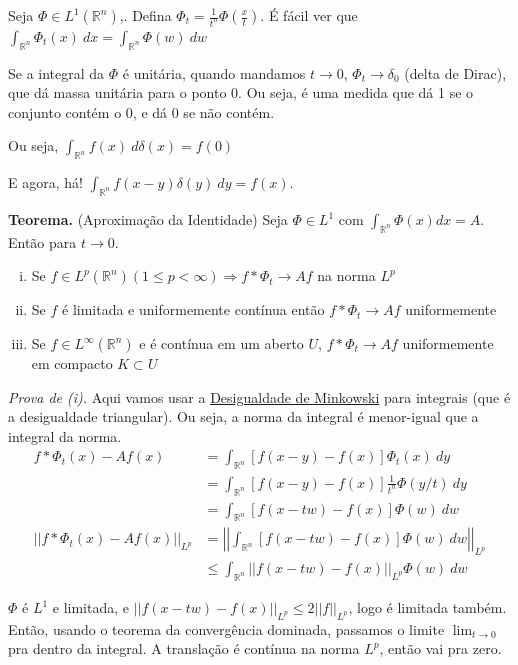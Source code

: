 \documentclass[11pt]{article}
\newcommand{\Rn}{{\mathbb{R}^n}}
\newcommand{\norm}[2]{\left|\left|#1\right|\right|_{L^{#2}}}
\begin{document}
Seja \(\Phi \in L^1(\Rn)\),. Defina \( \Phi_t = \frac{1}{t^n} \Phi(\frac{x}{t}) \). É fácil ver que \(\int_{\mathbb{R}^n} \Phi_t(x)\ dx = \int_{\mathbb{R}^n} \Phi(w)\ dw \)

Se a integral da \(\Phi\) é unitária, quando mandamos \(t \rightarrow 0 \), \(\Phi_t \rightarrow \delta_0\) (delta de Dirac), que dá massa unitária para o ponto \(0\). Ou seja, é uma medida que dá 1 se o conjunto contém o 0, e dá 0 se não contém.

Ou seja, \(\int_\Rn f(x)\ d\delta(x) = f(0)\)

E agora, há! \(\int_\Rn f(x-y) \delta(y) \ dy = f(x)\). 

\textbf{Teorema.} (Aproximação da Identidade) Seja \(\Phi \in L^1\) com \(\int_{\mathbb{R}^n} \Phi(x)dx = A \). Então para \(t\rightarrow 0 \).

\begin{enumerate}[(i)]
	\item Se \(f \in L^p (\mathbb{R}^n) (1\leq p < \infty) \Rightarrow f * \Phi_t \rightarrow Af \) na norma \(L^p\)
	\item Se \(f\) é limitada e uniformemente contínua então \( f * \Phi_t \rightarrow Af \) uniformemente 
	\item Se \( f \in L^\infty (\mathbb{R}^n)\) e é contínua em um aberto \(U\), \( f * \Phi_t \rightarrow Af \) uniformemente em compacto \( K \subset U\)
	
\end{enumerate}

\textit{Prova de (i).} Aqui vamos usar a \href{https://en.wikipedia.org/wiki/Minkowski_inequality}{Desigualdade de Minkowski} para integrais (que é a desigualdade triangular). Ou seja, a norma da integral é menor-igual que a integral da norma. \begin{align*}
	f * \Phi_t (x) - Af(x) &= \int_\Rn \left[ f(x-y) - f(x) \right] \Phi_t(x)\ dy \\
	&= \int_\Rn \left[ f(x - y) - f(x) \right] \frac{1}{t^n}\Phi(y/t)\ dy \\
	&= \int_\Rn \left[ f(x - tw) - f(x) \right] \Phi(w)\ dw \\
	\norm{f * \Phi_t (x) - Af(x)}{p} &= \norm{\int_\Rn \left[ f(x - tw) - f(x) \right] \Phi(w)\ dw}{p} \\
	&\leq \int_\Rn \norm{f(x - tw) - f(x)}{p} \Phi(w) \ dw
\end{align*}

\(\Phi\) é \(L^1\) e limitada, e \(\norm{f(x - tw) - f(x)}{p} \leq 2 \norm{f}{p}\), logo é limitada também. Então, usando o teorema da convergência dominada, passamos o limite \(\lim_{t \rightarrow0}\) pra dentro da integral. A translação é contínua na norma \(L^p\), então vai pra zero.
\end{document}

